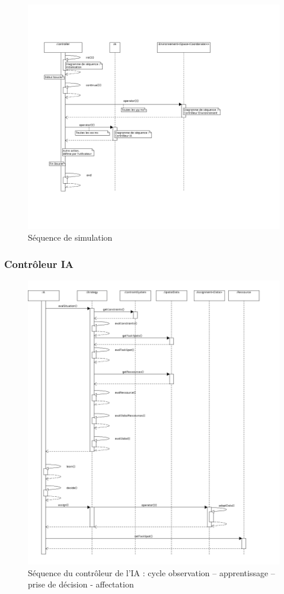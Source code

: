 \begin{figure}[!h]\centering
   \includegraphics[scale=0.5]{images/seq_simu.png}
   \caption{\label{seq_init} Séquence de simulation}
\end{figure}
\subsubsection{Contrôleur IA}

\begin{figure}[!h]\centering
   \includegraphics[scale=0.5]{images/seq_ia.png}
   \caption{\label{seq_init} Séquence du contrôleur de l'IA : cycle \og observation – apprentissage – prise de décision - affectation \fg}
\end{figure}
%
